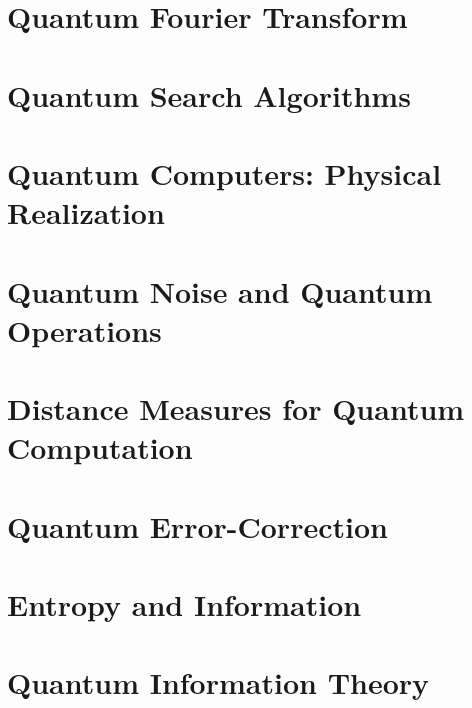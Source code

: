 \documentclass{article}
\theoremstyle{definition}
\begin{document}
\section{Quantum Fourier Transform}


\section{Quantum Search Algorithms}


\section{Quantum Computers: Physical Realization}


\section{Quantum Noise and Quantum Operations}


\section{Distance Measures for Quantum Computation}


\section{Quantum Error-Correction}


\section{Entropy and Information}


\section{Quantum Information Theory}
\end{document}
